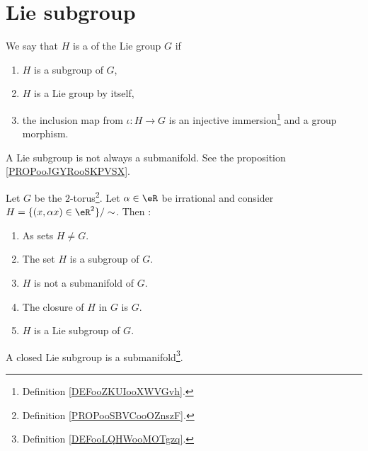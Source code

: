 \section{Lie subgroup}

\begin{definition}        \label{DEFooGCHDooHUMSju}
    We say that \( H\) is a  of the Lie group \( G\) if
    \begin{enumerate}
        \item
            \( H\) is a subgroup of \( G\),
        \item
            \( H\) is a Lie group by itself,
        \item
            the inclusion map from \( \iota\colon H\to G\) is an injective immersion\footnote{Definition \ref{DEFooZKUIooXWVGvh}.} and a group morphism.
    \end{enumerate}
\end{definition}

\begin{remark}
    A Lie subgroup is not always a submanifold. See the proposition \ref{PROPooJGYRooSKPVSX}.
\end{remark}

\begin{proposition}        \label{PROPooJGYRooSKPVSX}
    Let \( G\) be the \( 2\)-torus\footnote{Definition \ref{PROPooSBVCooOZnszF}.}. Let \( \alpha\in \eR\) be irrational and consider \( H=\{ (x,\alpha x)\in \eR^2 \}/\sim\). Then :
    \begin{enumerate}
        \item
            As sets \( H\neq G\).
        \item
            The set \( H\) is a subgroup of \( G\).
        \item
            \( H\) is not a submanifold of \( G\).
        \item
            The closure of \( H\) in \( G\) is \( G\).
        \item
            \( H\) is a Lie subgroup of \( G\).
    \end{enumerate}
\end{proposition}


\begin{proposition}     \label{PROPooFXZJooCOFXZX}
    A closed Lie subgroup is a submanifold\footnote{Definition \ref{DEFooLQHWooMOTgzq}.}. 
\end{proposition}

